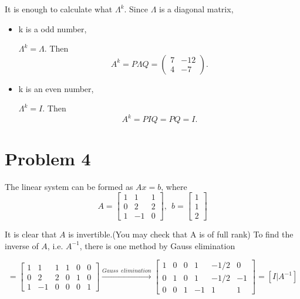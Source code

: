 \documentclass[12pt]{article}
\begin{document}
It is enough to calculate what $\Lambda^k$. Since $\Lambda$ is a diagonal matrix, 
\begin{itemize}
\item k is a odd number, 

$\Lambda ^k = \Lambda$. Then 
\begin{equation*}
A^k = P\Lambda Q = \begin{pmatrix}
7 & -12 \\
4 & -7
\end{pmatrix}.
\end{equation*}
\item k is an even number, 

$\Lambda ^k = I$. Then 
\begin{equation*}
A^k = PIQ = PQ = I.
\end{equation*}

\end{itemize}

\section{Problem 4}

The linear system can be formed as $Ax = b$, where
\begin{equation*}
A = \begin{bmatrix}
1 & 1 & 1\\
0 & 2 & 2\\
1 & -1 & 0
\end{bmatrix}, \ \ 
b = \begin{bmatrix}
1 \\
1 \\
2
\end{bmatrix}
\end{equation*}

It is clear that $A$ is invertible.(You may check that A is of full rank)
To find the inverse of $A$, i.e. $A^{-1}$, there is one method by Gauss elimination

\begin{equation*}
[A|I] = \begin{bmatrix}
1 & 1 & 1 & 1 & 0 & 0 \\
0 & 2 & 2 & 0 & 1 & 0 \\
1 & -1 & 0 & 0 & 0 & 1
\end{bmatrix} \xrightarrow {Gauss \ \ elimination}
\begin{bmatrix}
1 & 0 & 0 & 1 & -1/2 & 0 \\
0 & 1 & 0 & 1 & -1/2 & -1 \\
0 & 0 & 1 & -1 & 1 & 1 
\end{bmatrix} = [I|A^{-1}]
\end{equation*}
\end{document}
